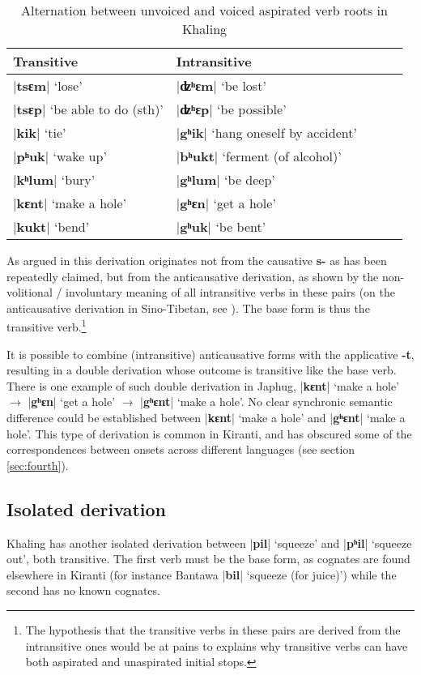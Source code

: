 \documentclass[oneside,a4paper,11pt]{article}
\newcommand{\ipa}[1]{\textbf{{\phon\mbox{#1}}}} %
\newcommand{\dhatu}[2]{|\ipa{#1}| `#2'}
\begin{document}
\begin{table}[H]
\caption{Alternation between unvoiced and voiced aspirated verb roots in Khaling} \centering \label{tab:anticaus}
\begin{tabular}{lllll}
\toprule
Transitive & Intransitive&  \\
\midrule
\dhatu{tsɛm}{lose} & \dhatu{ʣʰɛm}{be lost} \\
\dhatu{tsɛp}{be able to do (sth)} & \dhatu{ʣʰɛp}{be possible} \\
\dhatu{kik}{tie} & \dhatu{gʰik}{hang oneself by accident} \\
\dhatu{pʰuk}{wake up} & \dhatu{bʰukt}{ferment (of alcohol)} \\
\dhatu{kʰlum}{bury} & \dhatu{gʰlum}{be deep} \\
\midrule
\dhatu{kɛnt}{make a hole} & \dhatu{gʰɛn}{get a hole} \\
\dhatu{kukt}{bend} & \dhatu{gʰuk}{be bent}\\
\bottomrule
\end{tabular}
\end{table}

As argued in \citet{jacques15derivational.khaling} this derivation originates not from the causative \ipa{s-} as has been repeatedly claimed, but from the anticausative derivation, as shown by the non-volitional / involuntary meaning of all intransitive verbs in these pairs (on the anticausative derivation in Sino-Tibetan, see  \citealt{jacques15spontaneous, jacques15causative, hill14voicing}). The base form is thus the transitive verb.\footnote{The hypothesis that the transitive verbs in these pairs are derived from the intransitive ones would be at pains to explains why transitive verbs can have both aspirated and unaspirated initial stops.}

It is possible to combine (intransitive) anticausative forms with the applicative \ipa{-t}, resulting in a double derivation whose outcome is transitive like the base verb. There is one example of such double derivation in Japhug, \dhatu{kɛnt}{make a hole} $\rightarrow$  \dhatu{gʰɛn}{get a hole} $\rightarrow$  \dhatu{gʰɛnt}{make a hole}. No clear synchronic semantic difference could be established between \dhatu{kɛnt}{make a hole} and \dhatu{gʰɛnt}{make a hole}. This type of derivation is common in Kiranti, and has obscured some of the correspondences between onsets across different languages (see section \ref{sec:fourth}).

\subsection{Isolated derivation} \label{sec:isolated}
Khaling has another isolated derivation between \dhatu{pil}{squeeze} and  \dhatu{pʰil}{squeeze out}, both transitive. The first verb must be the base form, as cognates are found elsewhere in Kiranti (for instance Bantawa \dhatu{bil}{squeeze (for juice)}) while the second has no known cognates. 
\end{document}
